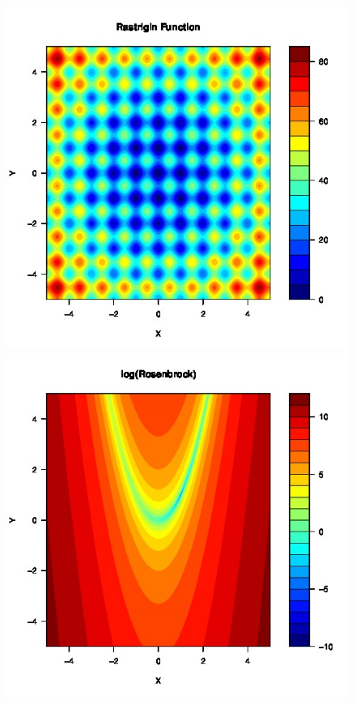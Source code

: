 \documentclass{article}
\begin{document}
\begin{figure}
        \begin{center}
                \begin{minipage}[h!]{0.49\textwidth}
                        \includegraphics[width=1.0\textwidth]{rastContour.jpg}
                \end{minipage}
                \begin{minipage}[h!]{0.49\textwidth}
                        \includegraphics[width=1.0\textwidth]{roseContour.jpg}
                \end{minipage}
        \end{center}
\end{figure}
\end{document}
